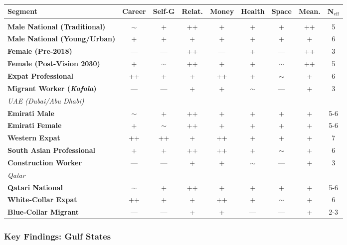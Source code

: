 \begin{center}
\tiny
\begin{longtable}{@{}l|ccccccc|c@{}}
\toprule
\textbf{Segment} & \textbf{Career} & \textbf{Self-G} & \textbf{Relat.} & \textbf{Money} & \textbf{Health} & \textbf{Space} & \textbf{Mean.} & \textbf{N$_{\text{eff}}$} \\
\midrule
\endfirsthead
\bottomrule
\endlastfoot
\multicolumn{9}{l}{\textit{Saudi Arabia}} \\
\textbf{Male National (Traditional)} & $\sim$ & + & ++ & + & + & + & ++ & 5 \\
\textbf{Male National (Young/Urban)} & + & + & + & + & + & + & + & 6 \\
\textbf{Female (Pre-2018)} & — & — & ++ & — & + & — & ++ & 3 \\
\textbf{Female (Post-Vision 2030)} & + & $\sim$ & ++ & + & + & $\sim$ & ++ & 5 \\
\textbf{Expat Professional} & ++ & + & + & ++ & + & $\sim$ & + & 6 \\
\textbf{Migrant Worker (\textit{Kafala})} & — & — & + & + & $\sim$ & — & + & 3 \\
\midrule
\multicolumn{9}{l}{\textit{UAE (Dubai/Abu Dhabi)}} \\
\textbf{Emirati Male} & $\sim$ & + & ++ & + & + & + & + & 5-6 \\
\textbf{Emirati Female} & + & $\sim$ & ++ & + & + & + & + & 5-6 \\
\textbf{Western Expat} & ++ & ++ & + & ++ & + & + & + & 7 \\
\textbf{South Asian Professional} & + & + & ++ & ++ & + & $\sim$ & + & 6 \\
\textbf{Construction Worker} & — & — & + & + & $\sim$ & — & + & 3 \\
\midrule
\multicolumn{9}{l}{\textit{Qatar}} \\
\textbf{Qatari National} & $\sim$ & + & ++ & + & + & + & + & 5-6 \\
\textbf{White-Collar Expat} & ++ & + & + & ++ & + & $\sim$ & + & 6 \\
\textbf{Blue-Collar Migrant} & — & — & + & + & — & — & + & 2-3 \\
\end{longtable}
\end{center}

\subsubsection{Key Findings: Gulf States}

